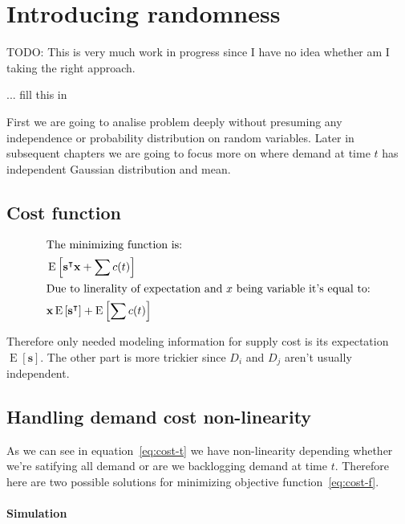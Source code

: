 
\chapter{Introducing randomness}
\label{chap:solution-randomness}


TODO: This is very much work in progress since I have no idea whether am I taking the right approach.

... fill this in

First we are going to analise problem deeply without presuming any independence or probability distribution on random variables. Later in subsequent chapters we are going to focus more on where demand at time $t$ has independent Gaussian distribution and mean.

\section{Cost function}
\begin{align*}
\shortintertext{The minimizing function is:}
    & \operatorname{E} \left[
        \mathbf{s}^\intercal\mathbf{x} + \sum{c(t)}
    \right] \\
\shortintertext{Due to linerality of expectation and $x$ being variable it's equal to:}
    & \mathbf{x} \operatorname{E} \left[
        \mathbf{s}^\intercal
        \right] +
        \operatorname{E} \left[ \sum{c(t)} \right] \\
\end{align*}

Therefore only needed modeling information for supply cost is its expectation $\operatorname{E} \left[ \mathbf{s} \right]$. The other part is more trickier since $D_i$ and $D_j$ aren't usually independent.

\section{Handling demand cost non-linearity}
\label{sec:Handling demand cost non-linearity}

As we can see in equation~\ref{eq:cost-t} we have non-linearity depending whether we're satifying all demand or are we backlogging demand at time $t$. Therefore here are two possible solutions for minimizing objective function~\ref{eq:cost-f}.

\subsubsection{Simulation}
\label{subs:Simulation}

